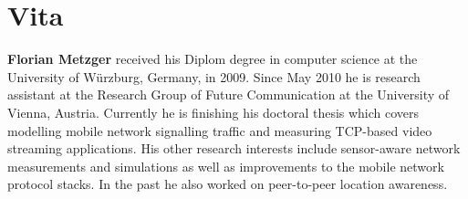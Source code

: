 
\chapter*{Vita}
{}%

\begingroup
	\let\clearpage\relax
	\let\cleardoublepage\relax

	\textbf{Florian Metzger} received his Diplom degree in computer science at the University of Würzburg, Germany, in 2009. Since May 2010 he is research assistant at the Research Group of Future Communication at the University of Vienna, Austria. Currently he is finishing his doctoral thesis which covers modelling mobile network signalling traffic and measuring TCP-based video streaming applications. His other research interests include sensor-aware network measurements and simulations as well as improvements to the mobile network protocol stacks. In the past he also worked on peer-to-peer location awareness.

\endgroup